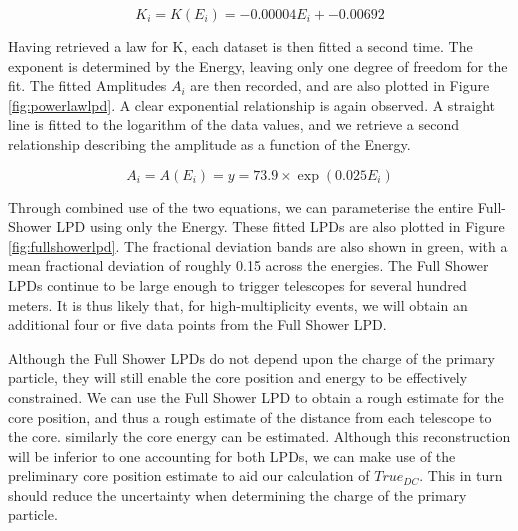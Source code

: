\documentclass[11pt]{article}
\begin{document}
\[ K_{i} = K(E_{i}) = -0.00004 E_{i} + -0.00692 \]

Having retrieved a law for K, each dataset is then fitted a second time. The exponent is determined by the Energy, leaving only one degree of freedom for the fit. The fitted Amplitudes $A_{i}$ are then recorded, and are also plotted in Figure \ref{fig:powerlawlpd}. A clear exponential relationship is again observed. A straight line is fitted to the logarithm of the data values, and we retrieve a second relationship describing the amplitude as a function of the Energy.

\[ A_{i} = A(E_{i}) =y =73.9 \times \exp (0.025 E_{i}) \]

Through combined use of the two equations, we can parameterise the entire Full-Shower LPD using only the Energy. These fitted LPDs are also plotted in Figure \ref{fig:fullshowerlpd}. The fractional deviation bands are also shown in green, with a mean fractional deviation of roughly 0.15 across the energies. The Full Shower LPDs continue to be large enough to trigger telescopes for several hundred meters. It is thus likely that, for high-multiplicity events, we will obtain an additional four or five data points from the Full Shower LPD.

Although the Full Shower LPDs do not depend upon the charge of the primary particle, they will still enable the core position and energy to be effectively constrained. We can use the Full Shower LPD to obtain a rough estimate for the core position, and thus a rough estimate of the distance from each telescope to the core. similarly the core energy can be estimated. Although this reconstruction will be inferior to one accounting for both LPDs, we can make use of the preliminary core position estimate to aid our calculation of $True_{DC}$. This in turn should reduce the uncertainty when determining the charge of the primary particle.
\end{document}
